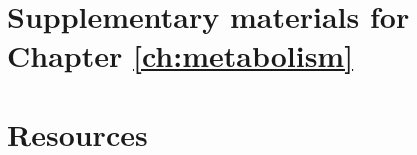 %

%

\chapter{Supplementary materials for Chapter \ref{ch:metabolism}}
\label{appendix:supp:metabolism}


\chapter{Resources}
\label{appendix:resources}



%

%

%
